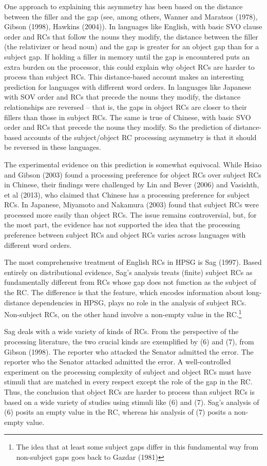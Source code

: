 \documentclass[a4paper]{article}
\begin{document}
One approach to explaining this asymmetry has been based on the distance between the filler and the gap (see, among others, Wanner and Maratsos (1978), Gibson (1998), Hawkins (2004)).  In languages like English, with basic SVO clause order and RCs that follow the nouns they modify, the distance between the filler (the relativizer or head noun) and the gap is greater for an object gap than for a subject gap.  If holding a filler in memory until the gap is encountered puts an extra burden on the processor, this could explain why object RCs are harder to process than subject RCs.   This distance-based account makes an interesting prediction for languages with different word orders.  In languages like Japanese with SOV order and RCs that precede the nouns they modify, the distance relationships are reversed -- that is, the gaps in object RCs are closer to their fillers than those in subject RCs.  The same is true of Chinese, with basic SVO order and RCs that precede the nouns they modify.  So the prediction of distance-based accounts of the subject/object RC processing asymmetry is that it should be reversed in these languages.

The experimental evidence on this prediction is somewhat equivocal.  While Hsiao and Gibson (2003) found a processing preference for object RCs over subject RCs in Chinese, their findings were challenged by Lin and Bever (2006) and Vasishth, et al (2013), who claimed that Chinese has a processing preference for subject RCs.  In Japanese, Miyamoto and Nakamura (2003) found that subject RCs were processed more easily than object RCs.  The issue remains controversial, but, for the most part, the evidence has not supported the idea that the processing preference between subject RCs and object RCs varies across languages with different word orders.

The most comprehensive treatment of English RCs in HPSG is Sag (1997). Based entirely on distributional evidence, Sag's analysis treats (finite) subject RCs as fundamentally different from RCs whose gap does not function as the subject of the RC.  The difference is that the \slasch feature, which encodes information about long-distance dependencies in HPSG, plays no role in the analysis of subject RCs.  Non-subject RCs, on the other hand involve a non-empty \slasch value in the RC.\footnote{The idea that at least some subject gaps differ in this fundamental way from non-subject gaps goes back to Gazdar (1981)}   

Sag deals with a wide variety of kinds of RCs. From the perspective of the processing literature, the two crucial kinds are exemplified by (6) and (7), from Gibson (1998).
\eal
\ex The reporter who attacked the Senator admitted the error.
\ex The reporter who the Senator attacked admitted the error.
\zl
A well-controlled experiment on the processing complexity of subject and object RCs must have stimuli that are matched in every respect except the role of the gap in the RC.  Thus, the conclusion that object RCs are harder to process than subject RCs is based on a wide variety of studies using stimuli like (6) and (7).  Sag's analysis of (6) posits an empty \slasch value in the RC, whereas his analysis of (7) posits a non-empty \slasch value.  
\end{document}
